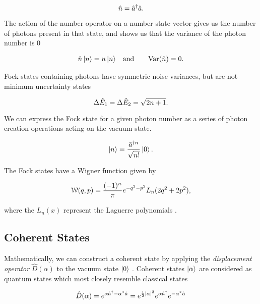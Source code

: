 \begin{equation}
  \label{eq:number_operator}
  \hat{n}= \hat{a}^\dagger \hat{a}.
\end{equation}

\noindent
The action of the number operator on a number state vector gives us the number of photons present in that state, and shows us that the variance of the photon number is 0

\begin{eqnarray}
  \label{eq:n_equation_phase}
  \hat{n}\left| n \right> = n \left| n \right>  \quad & \text{and} \quad & \text{Var}(\hat{n}) = 0.
\end{eqnarray}

\noindent
Fock states containing photons have symmetric noise variances, but are not minimum uncertainty states

\begin{equation}
  \label{eq:number_properties}
  \Delta \hat{E}_1 = \Delta \hat{E}_2 = \sqrt{2n+1}.
\end{equation}
 
\noindent
We can express the Fock state for a given photon number as a series of photon creation operations acting on the vacuum state.

\begin{equation}
  \label{eq:number_state}
  \left| n \right> = \frac{\hat{a}^{\dagger n}}{\sqrt{n!}}\left| 0 \right>.
\end{equation}

\noindent
The Fock states have a Wigner function given by

\begin{equation}
  \label{eq:wigner_fock}
  \mathcal{W}(q,p) = \frac{(-1)^n}{\pi} e^{-q^2-p^2}L_n(2q^2+2p^2),
\end{equation}

\noindent
where the $L_n(x)$ represent the Laguerre polynomials \cite{leonhardt1997measuring}.



\subsection{Coherent States}
\label{coherent_states} 

Mathematically, we can construct a coherent state by applying the
\emph{displacement operator} $ \hat{D}(\alpha)$ to the vacuum state $\left| 0 \right>$
\cite{scully1997quantum}.  Coherent states $\left| \alpha \right> $ are considered as quantum states which most closely resemble classical states

\begin{equation}
  \label{eq:displacment_operator}
  \hat{D}(\alpha) = e^{\alpha \hat{a}^\dagger - \alpha^* \hat{a}} = e^{\frac{1}{2}\left| \alpha \right|^2 }e^{\alpha \hat{a}^\dagger}e^{-\alpha^* \hat{a}}
\end{equation}



